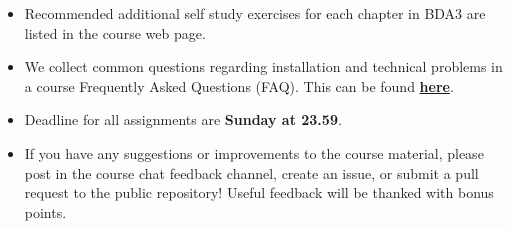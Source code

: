 \begin{itemize}
\item Recommended additional self study exercises for each chapter in BDA3 are listed in the course web page.
\item We collect common questions regarding installation and technical problems in a course Frequently Asked Questions (FAQ). This can be found \href{https://github.com/avehtari/BDA_course_Aalto/blob/master/FAQ.md}{\textbf{here}}.
\item Deadline for all assignments are \textbf{Sunday at 23.59}.
\item If you have any suggestions or improvements to the course material, please post in the course chat feedback channel, create an issue, or submit a pull request to the public repository! Useful feedback will be thanked with bonus points.
\end{itemize}
